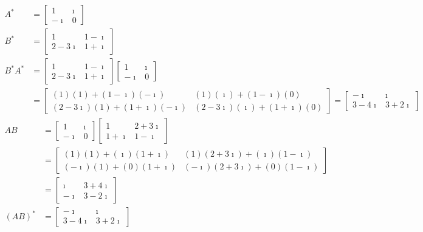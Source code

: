 \begin{solution}
\begin{align*}
A^* &=
\begin{bmatrix}
1 & \imath \\
-\imath & 0
\end{bmatrix} \\
B^* &=
\begin{bmatrix}
1 & 1-\imath \\
2-3\imath & 1+\imath
\end{bmatrix} \\
B^*A^* &= 
\begin{bmatrix}
1 & 1-\imath \\
2-3\imath & 1+\imath
\end{bmatrix} 
\begin{bmatrix}
1 & \imath \\
-\imath & 0
\end{bmatrix} \\
&=
\begin{bmatrix}
(1)(1) + (1-\imath)(-\imath) & (1)(\imath) + (1-\imath)(0)  \\
(2-3\imath)(1) + (1+\imath)(-\imath) & (2-3\imath)(\imath) + (1+\imath)(0)
\end{bmatrix} 
=
\begin{bmatrix}
-\imath & \imath \\
3-4\imath & 3+2\imath
\end{bmatrix} 
\end{align*}
\begin{align*}
AB &= 
\begin{bmatrix}
1 & \imath \\
-\imath & 0
\end{bmatrix} 
\begin{bmatrix}
1 & 2+3\imath \\
1+\imath & 1-\imath
\end{bmatrix} \\
&= 
\begin{bmatrix}
(1)(1)+(\imath)(1+\imath) & (1)(2+3\imath) + (\imath)(1-\imath) \\
(-\imath)(1)+(0)(1+\imath) & (-\imath)(2+3\imath) + (0)(1-\imath)
\end{bmatrix} \\
&= 
\begin{bmatrix}
\imath & 3+4\imath \\
-\imath & 3-2\imath
\end{bmatrix} \\
(AB)^* &= 
\begin{bmatrix}
-\imath & \imath \\
3-4\imath & 3+2\imath
\end{bmatrix} 
\end{align*}
\end{solution}


